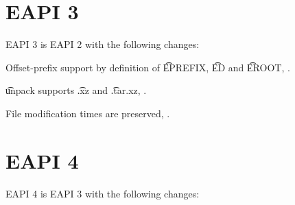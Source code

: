 \section*{EAPI 3}

EAPI 3 is EAPI 2 with the following changes:
\begin{compactitem}
\item Offset-prefix support by definition of \t{EPREFIX}, \t{ED} and \t{EROOT},
    .
\item \t{unpack} supports \t{.xz} and \t{.tar.xz}, .
\item File modification times are preserved, .
\end{compactitem}

\section*{EAPI 4}

EAPI 4 is EAPI 3 with the following changes:

